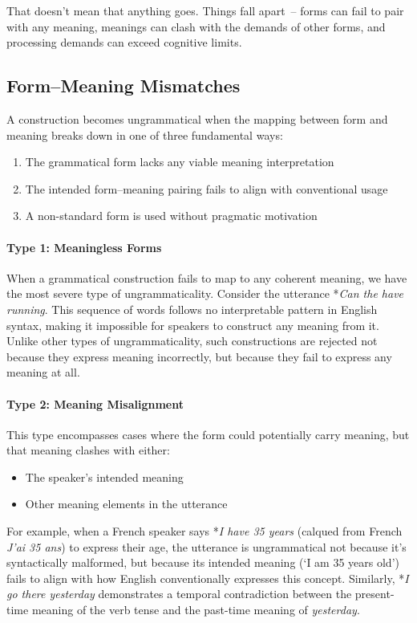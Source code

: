 That doesn't mean that anything goes. Things fall apart~-- forms can fail to pair with any meaning, meanings can clash with the demands of other forms, and processing demands can exceed cognitive limits.

\subsection{Form--Meaning Mismatches}
A construction becomes ungrammatical when the mapping between form and meaning breaks down in one of three fundamental ways:
\begin{enumerate}[noitemsep]
    \item The grammatical form lacks any viable meaning interpretation
    \item The intended form--meaning pairing fails to align with conventional usage
    \item A non-standard form is used without pragmatic motivation
\end{enumerate}

\paragraph*{Type 1: Meaningless Forms} When a grammatical construction fails to map to any coherent meaning, we have the most severe type of ungrammaticality. Consider the utterance *\textit{Can the have running}. This sequence of words follows no interpretable pattern in English syntax, making it impossible for speakers to construct any meaning from it. Unlike other types of ungrammaticality, such constructions are rejected not because they express meaning incorrectly, but because they fail to express any meaning at all.

\paragraph*{Type 2: Meaning Misalignment} This type encompasses cases where the form could potentially carry meaning, but that meaning clashes with either:
\begin{itemize}[noitemsep]
    \item The speaker's intended meaning
    \item Other meaning elements in the utterance
\end{itemize}

For example, when a French speaker says *\textit{I have 35 years} (calqued from French \textit{J'ai 35 ans}) to express their age, the utterance is ungrammatical not because it's syntactically malformed, but because its intended meaning (`I am 35 years old') fails to align with how English conventionally expresses this concept. Similarly, *\textit{I go there yesterday} demonstrates a temporal contradiction between the present-time meaning of the verb tense and the past-time meaning of \textit{yesterday}.

